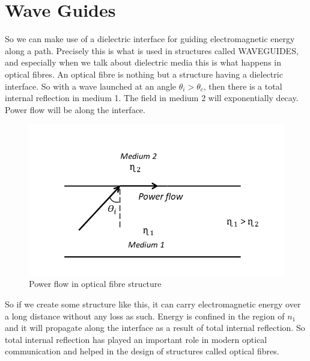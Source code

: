 \section{Wave Guides}

So we can make use of a dielectric interface for guiding electromagnetic energy along a path. Precisely this is what is used in structures called WAVEGUIDES, and especially when we talk about dielectric media this is what happens in optical fibres. An optical fibre is nothing but a structure having a dielectric interface. So with a wave launched at an angle $\theta_i > \theta_c$,
then there is a total internal reflection in medium 1. The field in medium 2 will exponentially decay. Power flow will be along the interface.

\begin{figure}[h]
\centering
\includegraphics[width=1\linewidth]{./graphics/optical_fibre}
\caption{Power flow in optical fibre structure}
\end{figure}

So if we create some structure like this, it can carry electromagnetic energy over a long distance without any loss as such. Energy is confined in the region of $n_1$ and it will propagate along the interface as a result of total internal reflection. So total internal reflection has played an important role in modern optical communication and helped in the design of structures called optical fibres. 
